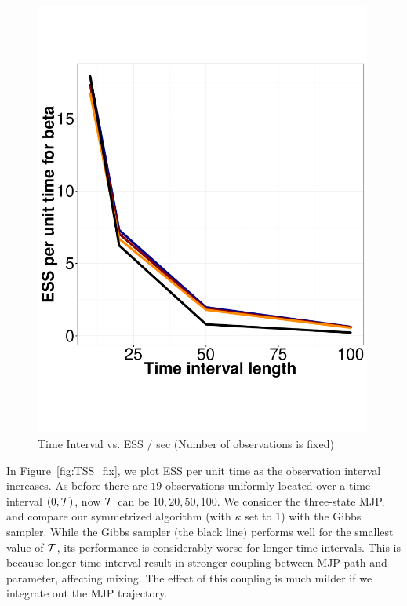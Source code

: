 \begin{figure}
\begin{minipage}[hp]{0.24\linewidth}
    \includegraphics [width=0.99\textwidth, angle=0]{figs/ESS_vs_t_beta.pdf}
  \end{minipage}
    \vspace{-0.3in}
    \caption{Time Interval vs. ESS / sec (Number of observations is fixed)}
     \label{fig:TSS}
  \end{figure}
In Figure~\ref{fig:TSS_fix}, we plot ESS per unit time as the observation 
interval increases. 
As before there are $19$ observations uniformly located over a time interval
$(0,{\mathcal T})$, now ${\mathcal T}$ can be $10, 20, 50, 100$. We consider the three-state 
MJP, and compare our symmetrized algorithm (with $\kappa$ set to $1$) with
the Gibbs sampler. 
While the Gibbs sampler (the black line) performs well for the smallest value
of ${\mathcal T}$, its performance is considerably worse for longer time-intervals.
This is because longer time interval result in stronger coupling between MJP
path and parameter, affecting mixing. The effect of this coupling is much milder
if we integrate out the MJP trajectory.

